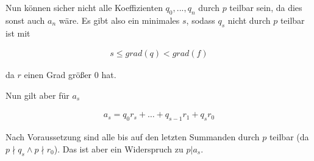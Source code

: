 \begin{solution}
Nun können sicher nicht alle Koeffizienten $q_0,...,q_n$ durch $p$ teilbar sein, da dies sonst auch $a_n$ wäre. Es gibt also ein minimales $s$, sodass $q_s$ nicht durch $p$ teilbar ist mit

\begin{align*}
  s \leq grad(q) < grad(f)
\end{align*}

da $r$ einen Grad größer $0$ hat.

Nun gilt aber für $a_s$

\begin{align*}
  a_s = q_0 r_s + \dots + q_{s-1}r_1 + q_s r_0
\end{align*}

Nach Voraussetzung sind alle bis auf den letzten Summanden durch $p$ teilbar (da $p \nmid q_s \land p \nmid r_0$). Das ist aber ein Widerspruch zu $p|a_s$.

\end{solution}
